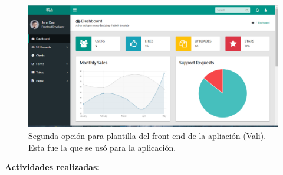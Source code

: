   \begin{figure}[H]
    \begin{center}
    \includegraphics[width=\textwidth]{vali.png}
    \caption{Segunda opción para plantilla del front end de la apliación (Vali). Esta fue la que se usó para la aplicación.}
    \label{fig:vali}
    \end{center}
    \end{figure}
\vskip 0.5cm
\pagebreak
\textbf{Actividades realizadas:}
